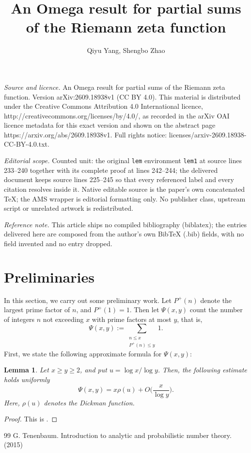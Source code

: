\documentclass[10pt,a4paper]{amsart}
\newtheorem{lem}[thm]{Lemma}
\numberwithin{equation}{section}
\newcommand{\Bg}{\Big}
\begin{document}
\title[An Omega result for partial sums of the Riemann zeta functio]{An Omega result for partial sums of the Riemann zeta function}
\author{Qiyu Yang, Shengbo Zhao}
\date{}
\maketitle
\noindent\emph{Source and licence.} An Omega result for partial sums of the Riemann zeta function. Version arXiv:2609.18938v1 (CC BY 4.0). This material is distributed under the Creative Commons Attribution 4.0 International licence, http://creativecommons.org/licenses/by/4.0/, as recorded in the arXiv OAI licence metadata for this exact version and shown on the abstract page https://arxiv.org/abs/2609.18938v1. Full rights notice: licenses/arxiv-2609.18938-CC-BY-4.0.txt.\par\smallskip
\noindent\textit{Editorial scope.} Counted unit: the original \texttt{lem} environment \texttt{lem1} at source lines 233--240 together with its complete proof at lines 242--244; the delivered document keeps source lines 225--245 so that every referenced label and every citation resolves inside it. Native editable source is the paper's own concatenated TeX; the AMS wrapper is editorial formatting only. No publisher class, upstream script or unrelated artwork is redistributed.
\par\smallskip\noindent\textit{Reference note.} This article ships no compiled bibliography (biblatex); the entries delivered here are composed from the author's own BibTeX (.bib) fields, with no field invented and no entry dropped.
\section{Preliminaries}
\label{sec-pre}

In this section, we carry out some preliminary work.  Let \(P^+(n)\) denote the largest prime factor of \(n\), and \(P^+(1)=1\). Then let \(\Psi(x,y)\) count the number of integers \(n\) not exceeding \(x\) with prime factors at most \(y\), that is,
\[
 \Psi(x,y) := \sum_{\substack{n \le x \\ P^+(n) \le y}} 1.
\]
First, we state the following approximate formula for \(\Psi(x,y)\):

\begin{lem}
\label{lem1}
    Let \(x \ge y \ge 2\), and put \(u =\log x/ \log y\). Then, the following estimate holds uniformly
    \[
    \Psi(x,y) = x \rho(u)+ O\Bg(\frac{x}{\log y}\Bg).
    \]
    Here, \(\rho(u)\) denotes the Dickman function.
\end{lem}

\begin{proof}
    This is \cite[Section 5.3, Theorem 6]{tenenbaumbook}.
\end{proof}

\begin{thebibliography}{99}
 G. Tenenbaum. Introduction to analytic and probabilistic number theory. (2015)
\end{thebibliography}
\end{document}
